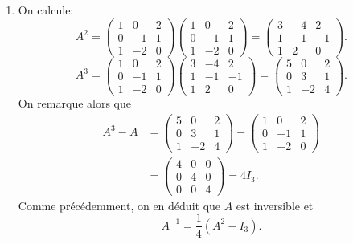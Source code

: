 {\begin{td-sol}[]
\begin{enumerate}
			\item On calcule:
			\begin{equation*}
				A^2 = 
				\begin{pmatrix}
					1 & 0 & 2\\
					0 & -1 & 1\\
					1 & -2 & 0
				\end{pmatrix}
				\begin{pmatrix}
					1 & 0 & 2\\
					0 & -1 & 1\\
					1 & -2 & 0
				\end{pmatrix}
				=
				\begin{pmatrix}
					3 & -4 & 2\\
					1 & -1 & -1\\
					1 & 2 & 0
				\end{pmatrix}.
			\end{equation*}
			\begin{equation*}
				A^3 = 
				\begin{pmatrix}
					1 & 0 & 2\\
					0 & -1 & 1\\
					1 & -2 & 0
				\end{pmatrix}
				\begin{pmatrix}
					3 & -4 & 2\\
					1 & -1 & -1\\
					1 & 2 & 0
				\end{pmatrix}
				=
				\begin{pmatrix}
					5 & 0 & 2\\
					0 & 3 & 1\\
					1 & -2 & 4
				\end{pmatrix}.
			\end{equation*}
			On remarque alors que
			\begin{equation*}
				\begin{aligned}
					A^3 - A
					&= 
					\begin{pmatrix}
						5 & 0 & 2\\
						0 & 3 & 1\\
						1 & -2 & 4
					\end{pmatrix}
					-
					\begin{pmatrix}
						1 & 0 & 2\\
						0 & -1 & 1\\
						1 & -2 & 0
					\end{pmatrix}\\
					&=
					\begin{pmatrix}
						4 & 0 & 0\\
						0 & 4 & 0\\
						0 & 0 & 4
					\end{pmatrix}
					= 4I_3.
				\end{aligned}
			\end{equation*}
			Comme précédemment, on en déduit que \(A\) est inversible et
			\begin{equation*}
				\boxed{A^{-1} = \frac14(A^2 - I_3)}.
			\end{equation*}


\end{enumerate}
\end{td-sol}}

